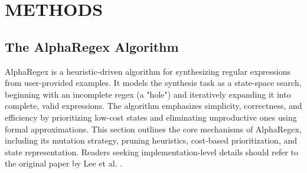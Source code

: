 %
%
%



\chapter{\MakeUppercase{Methods}}


\vspace{-0.4em} %
\section{The AlphaRegex Algorithm}
\vspace{-0.4em}

\indent\indent AlphaRegex is a heuristic-driven algorithm for synthesizing regular expressions from user-provided examples. It models the synthesis task as a state-space search, beginning with an incomplete regex (a "hole") and iteratively expanding it into complete, valid expressions. The algorithm emphasizes simplicity, correctness, and efficiency by prioritizing low-cost states and eliminating unproductive ones using formal approximations. This section outlines the core mechanisms of AlphaRegex, including its mutation strategy, pruning heuristics, cost-based prioritization, and state representation. Readers seeking implementation-level details should refer to the original paper by Lee et al. \cite{lee_2016_synthesizing}.

